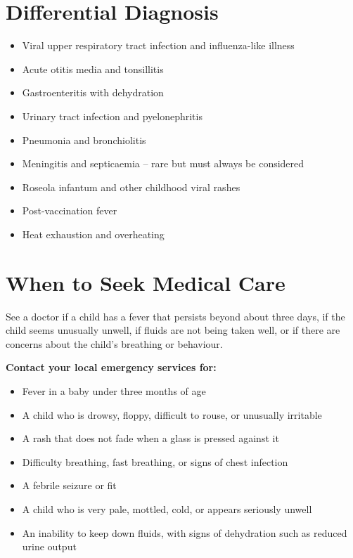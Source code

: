 \section*{Differential Diagnosis}
\begin{itemize}
    \item Viral upper respiratory tract infection and influenza-like illness
    \item Acute otitis media and tonsillitis
    \item Gastroenteritis with dehydration
    \item Urinary tract infection and pyelonephritis
    \item Pneumonia and bronchiolitis
    \item Meningitis and septicaemia -- rare but must always be considered
    \item Roseola infantum and other childhood viral rashes
    \item Post-vaccination fever
    \item Heat exhaustion and overheating
\end{itemize}

\section*{When to Seek Medical Care}
See a doctor if a child has a fever that persists beyond about three days, if the child seems unusually unwell, if fluids are not being taken well, or if there are concerns about the child's breathing or behaviour.

\medskip
\textbf{Contact your local emergency services for:}
\begin{itemize}
    \item Fever in a baby under three months of age
    \item A child who is drowsy, floppy, difficult to rouse, or unusually irritable
    \item A rash that does not fade when a glass is pressed against it
    \item Difficulty breathing, fast breathing, or signs of chest infection
    \item A febrile seizure or fit
    \item A child who is very pale, mottled, cold, or appears seriously unwell
    \item An inability to keep down fluids, with signs of dehydration such as reduced urine output
\end{itemize}

